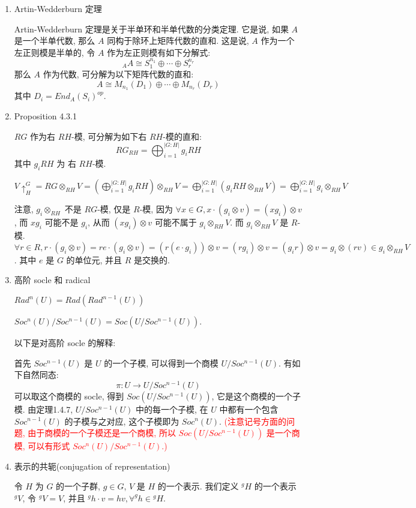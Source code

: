 \documentclass[UTF8]{ctexart}
\newcommand{\abs}[1]{\left\lvert#1\right\rvert}
\begin{document}
\begin{enumerate}
\item Artin-Wedderburn 定理

Artin-Wedderburn 定理是关于半单环和半单代数的分类定理. 它是说, 如果 $A$ 是一个半单代数, 那么 $A$ 同构于除环上矩阵代数的直和. 这是说, $A$ 作为一个左正则模是半单的, 令 $A$ 作为左正则模有如下分解式:
\[
_AA \cong S_1^{n_1} \oplus \cdots \oplus S_r^{n_r}
\]
那么 $A$ 作为代数, 可分解为以下矩阵代数的直和:
\[
A \cong M_{n_1}(D_1) \oplus \cdots \oplus M_{n_r}(D_r)
\]
其中 $D_i = End_A(S_i)^{op}$.

\item Proposition 4.3.1

$RG$ 作为右 $RH$-模, 可分解为如下右 $RH$-模的直和:
\[
RG_{RH} = \bigoplus^{\abs{G:H}}_{i=1} g_iRH
\]
其中 $g_iRH$ 为 右 $RH$-模.

$V\uparrow^G_H = RG \otimes_{RH}V = (\bigoplus^{\abs{G:H}}_{i=1} g_iRH) \otimes_{RH} V = \bigoplus^{\abs{G:H}}_{i=1}(g_iRH \otimes_{RH} V) = \bigoplus^{\abs{G:H}}_{i=1} g_i\otimes_{RH}V$

注意, $g_i\otimes_{RH}$ 不是 $RG$-模, 仅是 $R$-模, 因为 $\forall x \in G, x\cdot (g_i\otimes v) = (xg_i)\otimes v$, 而 $xg_i$ 可能不是 $g_i$, 从而 $(xg_i)\otimes v$ 可能不属于 $g_i \otimes_{RH} V$. 而 $g_i\otimes_{RH}V$ 是 $R$-模. $\forall r \in R, r \cdot (g_i\otimes v) = re\cdot(g_i\otimes v) = (r(e\cdot g_i))\otimes v = (rg_i)\otimes v = (g_ir)\otimes v = g_i\otimes (rv) \in g_i \otimes_{RH} V$. 其中 $e$ 是 $G$ 的单位元, 并且 $R$ 是交换的.

\item 高阶 socle 和 radical

$Rad^n(U) = Rad(Rad^{n-1}(U))$

$Soc^n(U)/Soc^{n-1}(U) = Soc(U/Soc^{n-1}(U))$.

以下是对高阶 socle 的解释:

首先 $Soc^{n-1}(U)$ 是 $U$ 的一个子模, 可以得到一个商模 $U/Soc^{n-1}(U)$. 有如下自然同态:
\[
\pi : U \to U/Soc^{n-1}(U)
\]
可以取这个商模的 socle, 得到 $Soc(U/Soc^{n-1}(U))$, 它是这个商模的一个子模. 由定理1.4.7\cite{dlab2012finite}, $U/Soc^{n-1}(U)$ 中的每一个子模, 在 $U$ 中都有一个包含 $Soc^{n-1}(U)$ 的子模与之对应, 这个子模即为 $Soc^n(U)$. \textcolor{red}{(注意记号方面的问题, 由于商模的一个子模还是一个商模, 所以 $Soc(U/Soc^{n-1}(U))$ 是一个商模, 可以有形式 $Soc^n(U)/Soc^{n-1}(U)$.)}

\item 表示的共轭(conjugation of representation)

令 $H$ 为 $G$ 的一个子群, $g \in G$, $V$ 是 $H$ 的一个表示. 我们定义 $^gH$ 的一个表示 $^gV$, 令 $^gV = V$, 并且 $^gh \cdot v = hv, \forall ^gh \in {}^gH$.


\end{enumerate}
\end{document}

